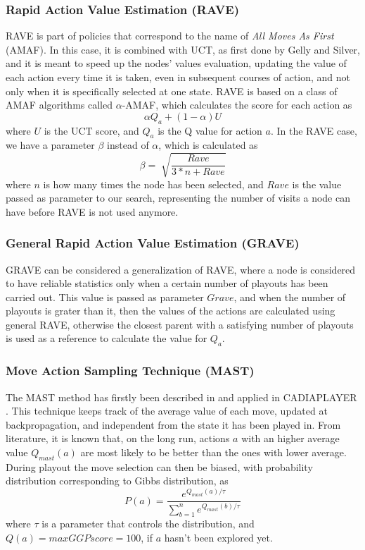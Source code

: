 \subsubsection*{Rapid Action Value Estimation (RAVE)}
RAVE is part of policies that correspond to the name of \emph{All Moves As First} (AMAF)\cite{brugmann1993monte,helmbold2009all}. In this case, it is combined with UCT, as first done by Gelly and Silver\cite{gelly2007combining,gelly2011monte}, and it is meant to speed up the nodes' values evaluation, updating the value of each action every time it is taken, even in subsequent courses of action, and not only when it is specifically selected at one state. RAVE is based on a class of AMAF algorithms called $\alpha$-AMAF, which calculates the score for each action as $$\alpha Q_a+(1-\alpha)U$$ where $U$ is the UCT score, and $Q_a$ is the Q value for action $a$. In the RAVE case, we have a parameter $\beta$ instead of $\alpha$, which is calculated as $$\beta=\sqrt[]{\frac{Rave}{3*n+Rave}}$$ where $n$ is how many times the node has been selected, and $Rave$ is the value passed as parameter to our search, representing the number of visits a node can have before RAVE is not used anymore\cite{browne2012survey,gelly2007combining,gelly2011monte}.
\subsubsection*{General Rapid Action Value Estimation (GRAVE)}
GRAVE can be considered a generalization of RAVE, where a node is considered to have reliable statistics only when a certain number of playouts has been carried out. This value is passed as parameter $Grave$, and when the number of playouts is grater than it, then the values of the actions are calculated using general RAVE, otherwise the closest parent with a satisfying number of playouts is used as a reference to calculate the value for $Q_a$\cite{cazenave2015generalized}. 
\subsubsection*{Move Action Sampling Technique (MAST)}
The MAST method has firstly been described in \cite{finnsson2008simulation} and applied in CADIAPLAYER \cite{finnsson2007cadia}. This technique keeps track of the average value of each move, updated at backpropagation, and independent from the state it has been played in. From literature, it is known that, on the long run, actions $a$ with an higher average value $Q_{mast}(a)$ are most likely to be better than the ones with lower average\cite{finnsson2009simulation}. During playout the move selection can then be biased, with probability distribution corresponding to Gibbs distribution, as $$P(a) = \frac{e^{Q_{mast}(a)/\tau}}{\sum_{b=1}^n e^{Q_{mast}(b)/\tau}}$$ where $\tau$ is a parameter that controls the distribution, and $Q(a) = max GGP score = 100$, if $a$ hasn't been explored yet\cite{finnsson2008simulation,finnsson2007cadia,finnsson2009simulation}.
